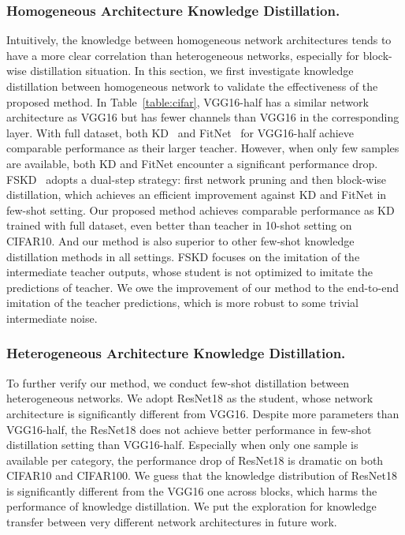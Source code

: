 \documentclass[letterpaper]{article} %
\begin{document}
{{{        \subsubsection{Homogeneous Architecture Knowledge Distillation.}
        Intuitively, the knowledge between homogeneous network architectures tends to have a more clear correlation than heterogeneous networks, especially for block-wise distillation situation.
        In this section, we first investigate knowledge distillation between homogeneous network to validate the effectiveness of the proposed method.
        In Table~\ref{table:cifar}, VGG16-half has a similar network architecture as VGG16 but has fewer channels than VGG16 in the corresponding layer.
        With full dataset, both KD~\cite{hinton2015distilling} and FitNet~\cite{romero2015fitnets} for VGG16-half achieve comparable performance as their larger teacher.
        However, when only few samples are available, both KD and FitNet encounter a significant performance drop.
        FSKD~\cite{li2018few} adopts a dual-step strategy: first network pruning and then block-wise distillation, which achieves an efficient improvement against KD and FitNet in few-shot setting.
        Our proposed method achieves comparable performance as KD trained with full dataset, even better than teacher in 10-shot setting on CIFAR10.
        And our method is also superior to other few-shot knowledge distillation methods in all settings.
        FSKD focuses on the imitation of the intermediate teacher outputs, whose student is not optimized to imitate the predictions of teacher.
        We owe the improvement of our method to the end-to-end imitation of the teacher predictions, which is more robust to some trivial intermediate noise.


        \subsubsection{Heterogeneous Architecture Knowledge Distillation.}
        To further verify our method, we conduct few-shot distillation between heterogeneous networks.
        We adopt ResNet18 as the student, whose network architecture is significantly different from VGG16.
        Despite more parameters than VGG16-half, the ResNet18 does not achieve better performance in few-shot distillation setting than VGG16-half.
        Especially when only one sample is available per category, the performance drop of ResNet18 is dramatic on both CIFAR10 and CIFAR100.
        We guess that the knowledge distribution of ResNet18 is significantly different from the VGG16 one across blocks, which harms the performance of knowledge distillation.
        We put the exploration for knowledge transfer between very different network architectures in future work.

}}}
\end{document}
